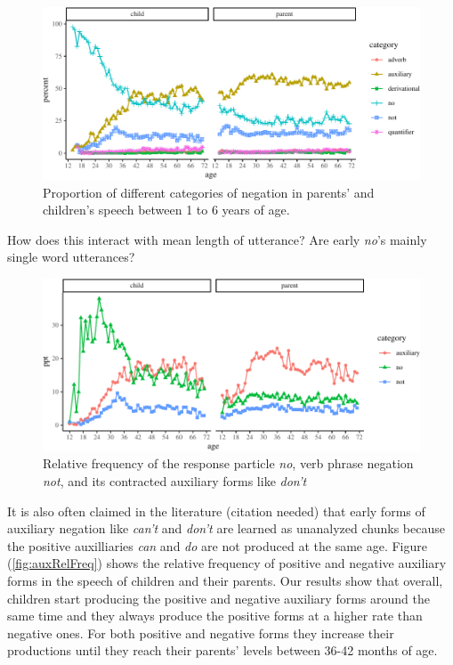 \documentclass[man,floatsintext,draftall]{apa6}
\begin{document}
\begin{figure}
\centering
\includegraphics{negation_production_files/figure-latex/negationProportionPlot-1.pdf}
\caption{\label{fig:negationProportionPlot}Proportion of different categories of negation in parents' and children's speech between 1 to 6 years of age.}
\end{figure}

How does this interact with mean length of utterance? Are early \emph{no}'s mainly single word utterances?

\begin{figure}
\centering
\includegraphics{negation_production_files/figure-latex/negationRelativeFrequency-1.pdf}
\caption{\label{fig:negationRelativeFrequency}Relative frequency of the response particle \emph{no}, verb phrase negation \emph{not}, and its contracted auxiliary forms like \emph{don't}}
\end{figure}

It is also often claimed in the literature (citation needed) that early forms of auxiliary negation like \emph{can't} and \emph{don't} are learned as unanalyzed chunks because the positive auxilliaries \emph{can} and \emph{do} are not produced at the same age. Figure (\ref{fig:auxRelFreq}) shows the relative frequency of positive and negative auxiliary forms in the speech of children and their parents. Our results show that overall, children start producing the positive and negative auxiliary forms around the same time and they always produce the positive forms at a higher rate than negative ones. For both positive and negative forms they increase their productions until they reach their parents' levels between 36-42 months of age.
\end{document}
